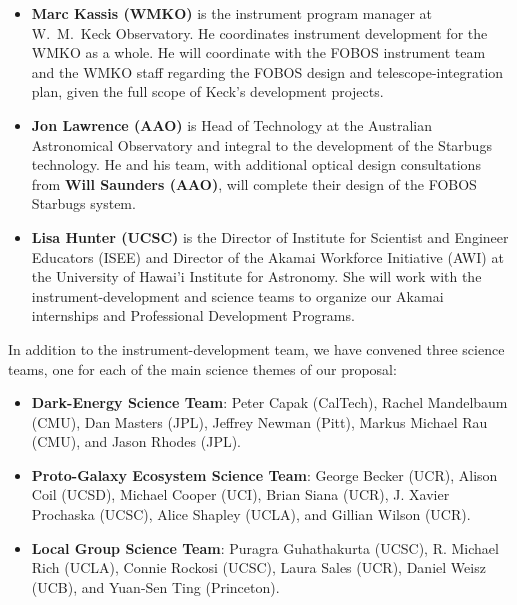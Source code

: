 \documentclass[oneside,11pt]{amsart}
\begin{document}
\begin{itemize}
%
\item {\bf Marc Kassis (WMKO)} is the instrument program manager at
W.~M.~Keck Observatory.  He coordinates instrument development for the
WMKO as a whole.  He will coordinate with the FOBOS instrument team and
the WMKO staff regarding the FOBOS design and telescope-integration
plan, given the full scope of Keck's development projects.\\[-10pt]
%
\item {\bf Jon Lawrence (AAO)} is Head of Technology at the Australian
Astronomical Observatory and integral to the development of the Starbugs
technology.  He and his team, with additional optical design
consultations from {\bf Will Saunders (AAO)}, will complete their design
of the FOBOS Starbugs system.\\[-10pt]
%
\item {\bf Lisa Hunter (UCSC)} is the Director of Institute for
Scientist and Engineer Educators (ISEE) and Director of the Akamai
Workforce Initiative (AWI) at the University of Hawai'i Institute for
Astronomy.  She will work with the instrument-development and science
teams to organize our Akamai internships and Professional Development
Programs.
%
\end{itemize}

\noindent In addition to the instrument-development team, we have convened three
science teams, one for each of the main science themes of our proposal:
%
\begin{itemize}
%
\item {\bf Dark-Energy Science Team}: Peter Capak (CalTech), Rachel
Mandelbaum (CMU), Dan Masters (JPL), Jeffrey Newman (Pitt), Markus
Michael Rau (CMU), and Jason Rhodes (JPL).\\[-10pt]
%
\item {\bf Proto-Galaxy Ecosystem Science Team}: George Becker (UCR),
Alison Coil (UCSD), Michael Cooper (UCI), Brian Siana (UCR), J. Xavier
Prochaska (UCSC), Alice Shapley (UCLA), and Gillian Wilson
(UCR).\\[-10pt]
%
\item {\bf Local Group Science Team}: Puragra Guhathakurta (UCSC), R.
Michael Rich (UCLA), Connie Rockosi (UCSC), Laura Sales (UCR), Daniel
Weisz (UCB), and Yuan-Sen Ting (Princeton).
%
\end{itemize}
\end{document}
